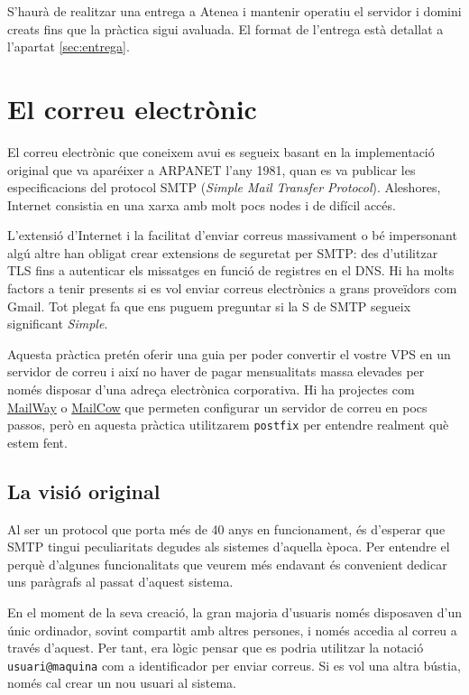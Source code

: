 \documentclass{practicaitic}
\begin{document}
S'haurà de realitzar una entrega a Atenea i mantenir operatiu el servidor 
i domini creats fins que la pràctica sigui avaluada. El format de l'entrega
està detallat a l'apartat \ref{sec:entrega}.

\section{El correu electrònic}

El correu electrònic que coneixem avui es segueix basant en la
implementació original que va aparéixer a ARPANET l'any
1981, quan es va publicar les especificacions del protocol SMTP
(\textit{Simple Mail Transfer Protocol}). Aleshores, Internet consistia
en una xarxa amb molt pocs nodes i de difícil accés.

L'extensió d'Internet i la facilitat d'enviar correus massivament o bé
impersonant algú altre han obligat crear extensions de seguretat per
SMTP: des d'utilitzar TLS fins a autenticar els missatges en funció
de registres en el DNS. Hi ha molts factors a tenir presents si
es vol enviar correus electrònics a grans proveïdors com Gmail.
Tot plegat fa que ens puguem preguntar si la S de SMTP segueix
significant \textit{Simple}.

Aquesta pràctica pretén oferir una guia per poder convertir el vostre
VPS en un servidor de correu i així no haver de pagar mensualitats 
massa elevades per només disposar d'una adreça electrònica corporativa.
Hi ha projectes com \href{https://docs.mailway.app/self-host/}{MailWay} o 
\href{https://docs.mailcow.email}{MailCow} que permeten configurar un
servidor de correu en pocs passos, però en aquesta pràctica utilitzarem
\texttt{postfix} per entendre realment què estem fent.

\subsection{La visió original}

Al ser un protocol que porta més de 40 anys en funcionament, és d'esperar
que SMTP tingui peculiaritats degudes als sistemes d'aquella època. Per
entendre el perquè d'algunes funcionalitats que veurem més endavant és
convenient dedicar uns paràgrafs al passat d'aquest sistema.

En el moment de la seva creació, la gran majoria d'usuaris només disposaven
d'un únic ordinador, sovint compartit amb altres persones, i només accedia
al correu a través d'aquest. Per tant, era lògic pensar que es podria
utilitzar la notació \texttt{usuari@maquina} com a identificador
per enviar correus. Si es vol una altra bústia, només cal crear un
nou usuari al sistema.
\end{document}
